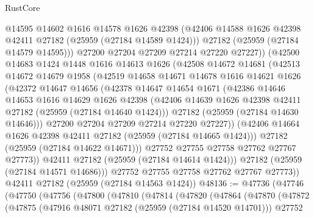 \begin{lexlean}{RustCore}
\begin{coremodule}
                @14595
                @14602
                @1616
                @14578
                @1626
                @42398
                (@42406 @14588 @1626 @42398 @42411 @27182 (@25959 (@27184 @14589 @1424)))
                @27182
                (@25959 (@27184 @14579 @14595)))
              @27200
              @27204
              @27209
              @27214
              @27220
              @27227))
          (@42500
            @14683
            @1424
            @1448
            @1616
            @14613
            @1626
            (@42508
              @14672
              @14681
              (@42513
                @14672
                @14679
                @1958
                (@42519
                  @14658
                  @14671
                  @14678
                  @1616
                  @14621
                  @1626
                  (@42372
                    @14647
                    @14656
                    (@42378
                      @14647
                      @14654
                      @1671
                      (@42386
                        @14646
                        @14653
                        @1616
                        @14629
                        @1626
                        @42398
                        (@42406 @14639 @1626 @42398 @42411 @27182 (@25959 (@27184 @14640 @1424)))
                        @27182
                        (@25959 (@27184 @14630 @14646)))
                      @27200
                      @27204
                      @27209
                      @27214
                      @27220
                      @27227))
                  (@42406 @14664 @1626 @42398 @42411 @27182 (@25959 (@27184 @14665 @1424)))
                  @27182
                  (@25959 (@27184 @14622 @14671)))
                @27752
                @27755
                @27758
                @27762
                @27767
                @27773))
            @42411
            @27182
            (@25959 (@27184 @14614 @1424)))
          @27182
          (@25959 (@27184 @14571 @14686)))
        @27752
        @27755
        @27758
        @27762
        @27767
        @27773))
    @42411
    @27182
    (@25959 (@27184 @14563 @1424))
@48136 := @47736
    (@47746
      (@47750
        (@47756
          (@47800
            (@47810
              (@47814
                (@47820
                  (@47864
                    (@47870
                      (@47872
                        (@47875
                          (@47916 @48071 @27182 (@25959 (@27184 @14520 @14701)))
                          @27752

\end{coremodule}
\end{lexlean}
